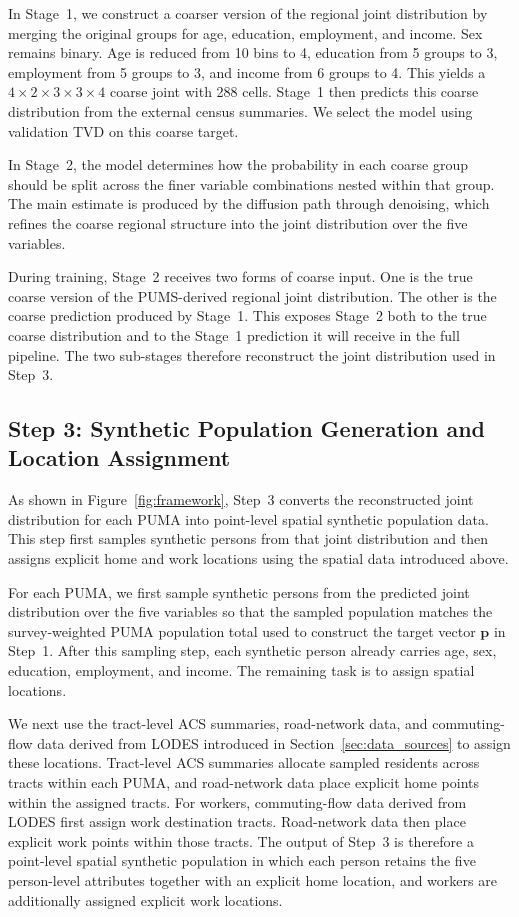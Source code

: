 \documentclass[11pt]{article}
\begin{document}
In Stage~1, we construct a coarser version of the regional joint distribution by merging the original groups for age, education, employment, and income. Sex remains binary. Age is reduced from 10 bins to 4, education from 5 groups to 3, employment from 5 groups to 3, and income from 6 groups to 4. This yields a $4 \times 2 \times 3 \times 3 \times 4$ coarse joint with 288 cells. Stage~1 then predicts this coarse distribution from the external census summaries. We select the model using validation TVD on this coarse target.

In Stage~2, the model determines how the probability in each coarse group should be split across the finer variable combinations nested within that group. The main estimate is produced by the diffusion path through denoising, which refines the coarse regional structure into the joint distribution over the five variables.

During training, Stage~2 receives two forms of coarse input. One is the true coarse version of the PUMS-derived regional joint distribution. The other is the coarse prediction produced by Stage~1. This exposes Stage~2 both to the true coarse distribution and to the Stage~1 prediction it will receive in the full pipeline. The two sub-stages therefore reconstruct the joint distribution used in Step~3.

\subsection{Step 3: Synthetic Population Generation and Location Assignment}
\label{sec:inference}

As shown in Figure~\ref{fig:framework}, Step~3 converts the reconstructed joint distribution for each PUMA into point-level spatial synthetic population data. This step first samples synthetic persons from that joint distribution and then assigns explicit home and work locations using the spatial data introduced above.

For each PUMA, we first sample synthetic persons from the predicted joint distribution over the five variables so that the sampled population matches the survey-weighted PUMA population total used to construct the target vector $\mathbf{p}$ in Step~1. After this sampling step, each synthetic person already carries age, sex, education, employment, and income. The remaining task is to assign spatial locations.

We next use the tract-level ACS summaries, road-network data, and commuting-flow data derived from LODES introduced in Section~\ref{sec:data_sources} to assign these locations. Tract-level ACS summaries allocate sampled residents across tracts within each PUMA, and road-network data place explicit home points within the assigned tracts. For workers, commuting-flow data derived from LODES first assign work destination tracts. Road-network data then place explicit work points within those tracts. The output of Step~3 is therefore a point-level spatial synthetic population in which each person retains the five person-level attributes together with an explicit home location, and workers are additionally assigned explicit work locations. 
\end{document}

